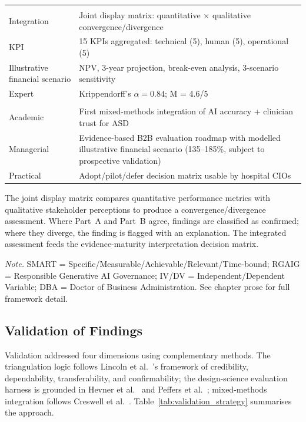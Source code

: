 {\begin{xltabular}{\textwidth}{@{} >{\raggedright\arraybackslash}p{2.5cm} L @{}}
\midrule
{} \\
\addlinespace
Integration & Joint display matrix: quantitative $\times$ qualitative convergence/divergence \\
KPI & 15 KPIs aggregated: technical (5), human (5), operational (5) \\
Illustrative financial scenario & NPV, 3-year projection, break-even analysis, 3-scenario sensitivity \\
Expert & Krippendorff's $\alpha = 0.84$; M = 4.6/5 \\
\midrule
{} \\
\addlinespace
Academic & First mixed-methods integration of AI accuracy + clinician trust for ASD \\
Managerial & Evidence-based B2B evaluation roadmap with modelled illustrative financial scenario (135--185\%, subject to prospective validation) \\
Practical & Adopt/pilot/defer decision matrix usable by hospital CIOs \\
\end{xltabular}} The joint display matrix compares quantitative performance metrics with qualitative stakeholder perceptions to produce a convergence/divergence assessment. Where Part~A and Part~B agree, findings are classified as confirmed; where they diverge, the finding is flagged with an explanation. The integrated assessment feeds the evidence-maturity interpretation decision matrix.

\vspace{0.3em}\noindent\textit{Note.} SMART = Specific/Measurable/Achievable/Relevant/Time-bound; RGAIG = Responsible Generative AI Governance; IV/DV = Independent/Dependent Variable; DBA = Doctor of Business Administration. See chapter prose for full framework detail.

\subsection{Validation of Findings}

Validation addressed four dimensions using complementary methods. The triangulation logic follows Lincoln et al.~\cite{lincoln1985naturalistic}'s framework of credibility, dependability, transferability, and confirmability; the design-science evaluation harness is grounded in Hevner et al.~\cite{hevner2004design} and Peffers et al.~\cite{peffers2007dsr}; mixed-methods integration follows Creswell et al.~\cite{creswell2017research}. Table~\ref{tab:validation_strategy} summarises the approach.

